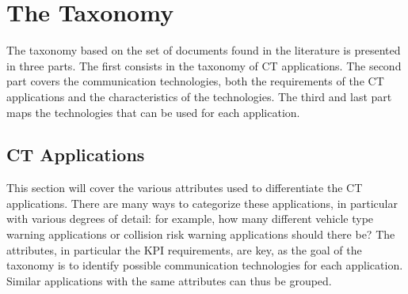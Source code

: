 \section{The Taxonomy}\label{sec:taxonomy}

The taxonomy based on the set of documents found in the literature is presented in three parts. The first consists in the taxonomy of \acrshort{CT} applications. The second part covers the communication technologies, both the requirements of the \acrshort{CT} applications and the characteristics of the technologies. The third and last part maps the technologies that can be used for each application. 

\subsection{\acrshort{CT} Applications}


This section will cover the various attributes used to differentiate the \acrshort{CT} applications. There are many ways to categorize these applications, in particular with various degrees of detail: for example, how many different vehicle type warning applications or collision risk warning applications should there be? The attributes, in particular the \acrshort{KPI} requirements, are key, as the goal of the taxonomy is to identify possible communication technologies for each application. Similar applications with the same attributes can thus be grouped. 


